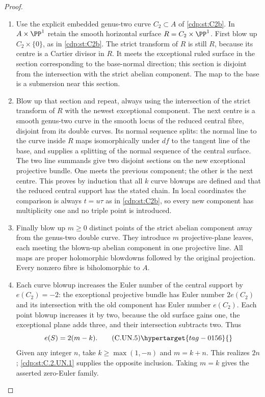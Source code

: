 \begin{proof}

\begin{enumerate}[label={$\langle1\rangle$\arabic*.},leftmargin=*]
\item Use the explicit embedded genus-two curve $C_2\subset A$ of \ref{cdp:st:C2b}.
In $A\times\PP^1$ retain the smooth horizontal surface
$R=C_2\times\PP^1$. First blow up $C_2\times\{0\}$, as in \ref{cdp:st:C2b}.
The strict transform of $R$ is still $R$, because its centre is a
Cartier divisor in $R$. It meets the exceptional ruled surface in
the section corresponding to the base-normal direction; this
section is disjoint from the intersection with the strict abelian
component. The map to the base is a submersion near this section.

\item Blow up that section and repeat, always using the intersection of
the strict transform of $R$ with the newest exceptional component.
The next centre is a smooth genus-two curve in the smooth locus of
the reduced central fibre, disjoint from its double curves. Its
normal sequence splits: the normal line to the curve inside $R$
maps isomorphically under $df$ to the tangent line of the base,
and supplies a splitting of the normal sequence of the central
surface. The two line summands give two disjoint sections on the
new exceptional projective bundle. One meets the previous
component; the other is the next centre. This proves by induction
that all $k$ curve blowups are defined and that the reduced central
support has the stated chain. In local coordinates the comparison
is always $t=u\tau$ as in \ref{cdp:st:C2b}, so every new component has
multiplicity one and no triple point is introduced.

\item Finally blow up $m\ge0$ distinct points of the strict abelian
component away from the genus-two double curve. They introduce
$m$ projective-plane leaves, each meeting the blown-up abelian
component in one projective line. All maps are proper holomorphic
blowdowns followed by the original projection. Every nonzero
fibre is biholomorphic to $A$.

\item Each curve blowup increases the Euler number of the central
support by $e(C_2)=-2$: the exceptional projective bundle has Euler
number $2e(C_2)$ and its intersection with the old component has
Euler number $e(C_2)$. Each point blowup increases it by two,
because the old surface gains one, the exceptional plane adds
three, and their intersection subtracts two. Thus
\[
                         e(S)=2(m-k).                 \tag{C.UN.5}\hypertarget{tag-0156}{}\label{cdp:eq:C.UN.5}
\]
Given any integer $n$, take $k\ge\max(1,-n)$ and $m=k+n$.
This realizes $2n$; \ref{cdp:st:C.2.UN.1} supplies the opposite inclusion.
Taking $m=k$ gives the asserted zero-Euler family.


\end{enumerate}
\end{proof}
